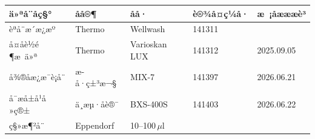 \documentclass[UTF8,10pt,a4paper,fontset=fandol]{ctexart}
\newcommand{\fieldvalue}[1]{#1}
\newcommand{\handwritten}[1]{#1}
\begin{document}
\small
\begin{tabularx}{\textwidth}{|X|X|X|X|X|}
\hline
ä»ªå¨åç§° & åå®¶ & åå· & è®¾å¤ç¼å· & æ ¡åæææè³ \\ \hline
\fieldvalue{èªå¨æ´æ¿æº} &
\fieldvalue{Thermo} &
\fieldvalue{Wellwash} &
\fieldvalue{\handwritten{141311}} &
\\ \hline
\fieldvalue{å¤åè½é¶æ ä»ª} &
\fieldvalue{Thermo} &
\fieldvalue{Varioskan LUX} &
\fieldvalue{\handwritten{141312}} &
\fieldvalue{\handwritten{2025.09.05}}
\\ \hline
\fieldvalue{å¾®å­æ¿æ¯è¡å¨} &
\fieldvalue{æ­å·ç±³æ¬§} &
\fieldvalue{MIX-7} &
\fieldvalue{\handwritten{141397}} &
\fieldvalue{\handwritten{2026.06.21}}
\\ \hline
\fieldvalue{å¯æå±å¹å»ç®±} &
\fieldvalue{ä¸æµ·åè®¯} &
\fieldvalue{BXS-400S} &
\fieldvalue{\handwritten{141403}} &
\fieldvalue{\handwritten{2026.06.22}}
\\ \hline
\fieldvalue{ç§»æ¶²å¨} &
\fieldvalue{Eppendorf} &
\fieldvalue{\handwritten{10--100\,\(\mu\)l}} &

\end{tabularx}
\end{document}
